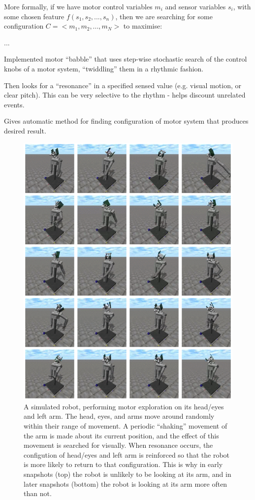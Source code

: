 More formally, if we have motor control variables $m_i$ and
sensor variables $s_i$, with some chosen feature $f(s_1,s_2,...,s_n)$,
then we are searching for some configuration $C=<m_1,m_2,...,m_N>$
to maximise:

...

Implemented motor ``babble'' that uses step-wise stochastic search of
the control knobs of a motor system, ``twiddling'' them in a rhythmic
fashion.

Then looks for a ``resonance'' in a specified sensed value
(e.g. visual motion, or clear pitch).  This can be very selective to
the rhythm - helps discount unrelated events.

Gives automatic method for finding configuration of motor system that
produces desired result.


\begin{figure}[p]
\centerline{\includegraphics[width=\textwidth]{images/find-arm}}
\caption{
%
A simulated robot, performing motor exploration on its
head/eyes and left arm.  The head, eyes, and arms move around randomly
within their range of movement.
%
A periodic ``shaking'' movement of the arm is made about its
current position, and the effect of this movement is searched 
for visually.
%
When resonance occurs, the configution of head/eyes and left arm
is reinforced so that the robot is more likely to return to that
configuration.
%
This is why 
in early snapshots (top) the robot is unlikely to be looking at 
its arm, and in later snapshots (bottom) the robot is looking at
its arm more often than not.
%
}
\end{figure}

